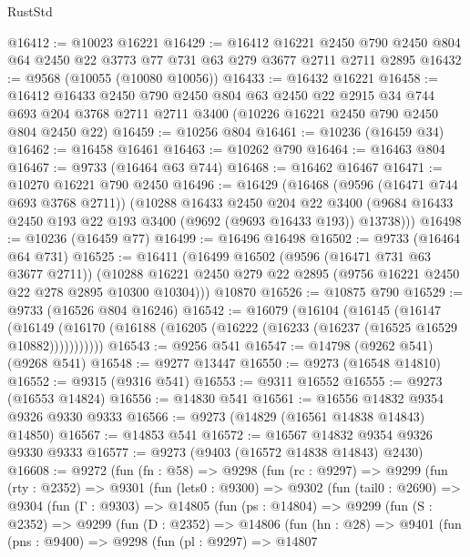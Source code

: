 \begin{lexlean}{RustStd}
\begin{coremodule}
@16412 := @10023 @16221
@16429 := @16412
    @16221
    @2450
    @790
    @2450
    @804
    @64
    @2450
    @22
    @3773
    @77
    @731
    @63
    @279
    @3677
    @2711
    @2711
    @2895
@16432 := @9568 (@10055 (@10080 @10056))
@16433 := @16432 @16221
@16458 := @16412
    @16433
    @2450
    @790
    @2450
    @804
    @63
    @2450
    @22
    @2915
    @34
    @744
    @693
    @204
    @3768
    @2711
    @2711
    @3400
    (@10226 @16221 @2450 @790 @2450 @804 @2450 @22)
@16459 := @10256 @804
@16461 := @10236 (@16459 @34)
@16462 := @16458 @16461
@16463 := @10262 @790
@16464 := @16463 @804
@16467 := @9733 (@16464 @63 @744)
@16468 := @16462 @16467
@16471 := @10270 @16221 @790 @2450
@16496 := @16429
    (@16468
      (@9596 (@16471 @744 @693 @3768 @2711))
      (@10288
        @16433
        @2450
        @204
        @22
        @3400
        (@9684 @16433 @2450 @193 @22 @193 @3400 (@9692 (@9693 @16433 @193)) @13738)))
@16498 := @10236 (@16459 @77)
@16499 := @16496 @16498
@16502 := @9733 (@16464 @64 @731)
@16525 := @16411
    (@16499
      @16502
      (@9596 (@16471 @731 @63 @3677 @2711))
      (@10288 @16221 @2450 @279 @22 @2895 (@9756 @16221 @2450 @22 @278 @2895 @10300 @10304)))
    @10870
@16526 := @10875 @790
@16529 := @9733 (@16526 @804 @16246)
@16542 := @16079
    (@16104
      (@16145
        (@16147
          (@16149 (@16170 (@16188 (@16205 (@16222 (@16233 (@16237 (@16525 @16529 @10882)))))))))))
@16543 := @9256 @541
@16547 := @14798 (@9262 @541) (@9268 @541)
@16548 := @9277 @13447
@16550 := @9273 (@16548 @14810)
@16552 := @9315 (@9316 @541)
@16553 := @9311 @16552
@16555 := @9273 (@16553 @14824)
@16556 := @14830 @541
@16561 := @16556 @14832 @9354 @9326 @9330 @9333
@16566 := @9273 (@14829 (@16561 @14838 @14843) @14850)
@16567 := @14853 @541
@16572 := @16567 @14832 @9354 @9326 @9330 @9333
@16577 := @9273 (@9403 (@16572 @14838 @14843) @2430)
@16608 := @9272
    (fun (fn : @58) =>
    @9298
      (fun (rc : @9297) =>
      @9299
        (fun (rty : @2352) =>
        @9301
          (fun (lets0 : @9300) =>
          @9302
            (fun (tail0 : @2690) =>
            @9304
              (fun (Γ : @9303) =>
              @14805
                (fun (ps : @14804) =>
                @9299
                  (fun (S : @2352) =>
                  @9299
                    (fun (D : @2352) =>
                    @14806
                      (fun (hn : @28) =>
                      @9401
                        (fun (pns : @9400) =>
                        @9298
                          (fun (pl : @9297) =>
                          @14807

\end{coremodule}
\end{lexlean}
